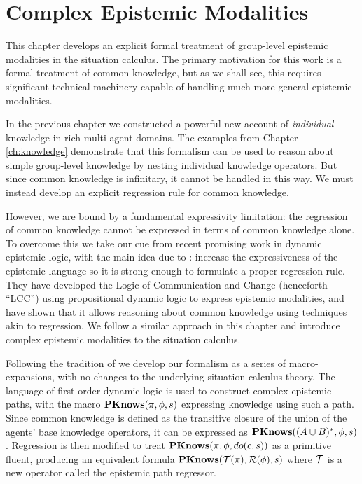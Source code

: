 

\chapter{Complex Epistemic Modalities}

\label{ch:cknowledge}

This chapter develops an explicit formal treatment of group-level
epistemic modalities in the situation calculus. The primary motivation
for this work is a formal treatment of common knowledge, but as we
shall see, this requires significant technical machinery capable of
handling much more general epistemic modalities.

In the previous chapter we constructed a powerful new account of \emph{individual}
knowledge in rich multi-agent domains. The examples from Chapter \ref{ch:knowledge}
demonstrate that this formalism can be used to reason about simple
group-level knowledge by nesting individual knowledge operators. But
since common knowledge is infinitary, it cannot be handled in this
way. We must instead develop an explicit regression rule for common
knowledge.

However, we are bound by a fundamental expressivity limitation: the
regression of common knowledge cannot be expressed in terms of common
knowledge alone. To overcome this we take our cue from recent promising
work in dynamic epistemic logic, with the main idea due to \citet{vanBenthem06lcc}:
increase the expressiveness of the epistemic language so it is strong
enough to formulate a proper regression rule. They have developed
the Logic of Communication and Change (henceforth {}``LCC'') using
propositional dynamic logic to express epistemic modalities, and have
shown that it allows reasoning about common knowledge using techniques
akin to regression. We follow a similar approach in this chapter and
introduce complex epistemic modalities to the situation calculus.

Following the tradition of \citet{scherl03sc_knowledge} we develop
our formalism as a series of macro-expansions, with no changes to
the underlying situation calculus theory. The language of first-order
dynamic logic is used to construct complex epistemic paths, with the
macro $\mathbf{PKnows}(\pi,\phi,s)$ expressing knowledge using such a path.
Since common knowledge is defined as the transitive closure of the
union of the agents' base knowledge operators, it can be expressed
as $\mathbf{PKnows}((A\cup B)^{*},\phi,s)$. Regression is then modified to
treat $\mathbf{PKnows}(\pi,\phi,do(c,s))$ as a primitive fluent, producing
an equivalent formula $\mathbf{PKnows}(\mathcal{T}(\pi),\mathcal{R}(\phi),s)$ where $\mathcal{T}$
is a new operator called the epistemic path regressor.

